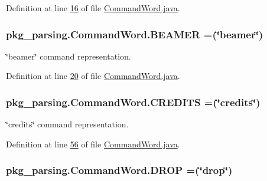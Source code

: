 Definition at line \hyperlink{CommandWord_8java_source_l00016}{16} of file \hyperlink{CommandWord_8java_source}{Command\-Word.\-java}.

\hypertarget{enumpkg__parsing_1_1CommandWord_a4d1c3647eaf81664624ed5effc590be4}{
\subsubsection[{B\-E\-A\-M\-E\-R}]{\setlength{\rightskip}{0pt plus 5cm}pkg\-\_\-parsing.\-Command\-Word.\-B\-E\-A\-M\-E\-R =(\char`\"{}beamer\char`\"{})}}\label{enumpkg__parsing_1_1CommandWord_a4d1c3647eaf81664624ed5effc590be4}


\char`\"{}beamer\char`\"{} command representation. 



Definition at line \hyperlink{CommandWord_8java_source_l00020}{20} of file \hyperlink{CommandWord_8java_source}{Command\-Word.\-java}.

\hypertarget{enumpkg__parsing_1_1CommandWord_a4267a564de4d81cec28764b1eeb3ce22}{
\subsubsection[{C\-R\-E\-D\-I\-T\-S}]{\setlength{\rightskip}{0pt plus 5cm}pkg\-\_\-parsing.\-Command\-Word.\-C\-R\-E\-D\-I\-T\-S =(\char`\"{}credits\char`\"{})}}\label{enumpkg__parsing_1_1CommandWord_a4267a564de4d81cec28764b1eeb3ce22}


\char`\"{}credits\char`\"{} command representation. 



Definition at line \hyperlink{CommandWord_8java_source_l00056}{56} of file \hyperlink{CommandWord_8java_source}{Command\-Word.\-java}.

\hypertarget{enumpkg__parsing_1_1CommandWord_abc97c312acca6eef77cc303d91d2d811}{
\subsubsection[{D\-R\-O\-P}]{\setlength{\rightskip}{0pt plus 5cm}pkg\-\_\-parsing.\-Command\-Word.\-D\-R\-O\-P =(\char`\"{}drop\char`\"{})}}\label{enumpkg__parsing_1_1CommandWord_abc97c312acca6eef77cc303d91d2d811}


